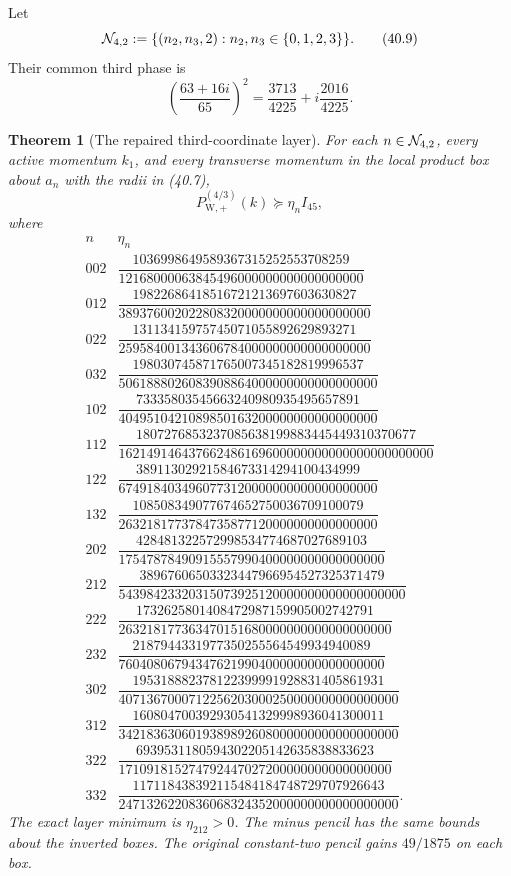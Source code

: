 \documentclass[11pt,oneside]{article}
\newtheorem{theorem}{Theorem}[section]
\theoremstyle{definition}
\theoremstyle{remark}
\begin{document}
Let
\[
 {\cal N}_{4,2}:=
 \{(n_2,n_3,2):n_2,n_3\in\{0,1,2,3\}\}.                \tag{40.9}
\]
Their common third phase is
\[
 \left(\frac{63+16i}{65}\right)^2
 =\frac{3713}{4225}+i\frac{2016}{4225}.                \tag{40.10}
\]

\begin{theorem}[The repaired third-coordinate layer]
\label{thm:newv40-sixteen-charts}
For each \(n\in{\cal N}_{4,2}\), every active momentum \(k_1\), and
every transverse momentum in the local product box about \(a_n\)
with the radii in (40.7),
\[
 P_{\mathrm W,+}^{(4/3)}(k)\succeq\eta_n I_{45},       \tag{40.11}
\]
where
\[
\begin{array}{c|c}
n&\eta_n\\ \hline
002&\dfrac{1036998649589367315252553708259}
{12168000063845496000000000000000000}\\[5pt]
012&\dfrac{19822686418516721213697603630827}
{389376002022808320000000000000000000}\\[5pt]
022&\dfrac{13113415975745071055892629893271}
{259584001343606784000000000000000000}\\[5pt]
032&\dfrac{198030745871765007345182819996537}
{5061888026083908864000000000000000000}\\[5pt]
102&\dfrac{73335803545663240980935495657891}
{4049510421089850163200000000000000000}\\[5pt]
112&\dfrac{1807276853237085638199883445449310370677}
{162149146437662486169600000000000000000000000}\\[5pt]
122&\dfrac{38911302921584673314294100434999}
{6749184034960773120000000000000000000}\\[5pt]
132&\dfrac{108508349077674652750036709100079}
{2632181773784735877120000000000000000}\\[5pt]
202&\dfrac{428481322572998534774687027689103}
{17547878490915557990400000000000000000}\\[5pt]
212&\dfrac{38967606503323447966954527325371479}
{54398423320315073925120000000000000000000}\\[5pt]
222&\dfrac{1732625801408472987159905002742791}
{263218177363470151680000000000000000000}\\[5pt]
232&\dfrac{2187944331977350255564549934940089}
{76040806794347621990400000000000000000}\\[5pt]
302&\dfrac{195318882378122399991928831405861931}
{4071367000712256203000250000000000000000}\\[5pt]
312&\dfrac{160804700392930541329998936041300011}
{3421836306019389892608000000000000000000}\\[5pt]
322&\dfrac{6939531180594302205142635838833623}
{171091815274792447027200000000000000000}\\[5pt]
332&\dfrac{117118438392115484184748729707926643}
{2471326220836068324352000000000000000000}.
\end{array}                                             \tag{40.12}
\]
The exact layer minimum is \(\eta_{212}>0\).  The minus pencil has
the same bounds about the inverted boxes.  The original
constant-two pencil gains \(49/1875\) on each box.
\end{theorem}
\end{document}
